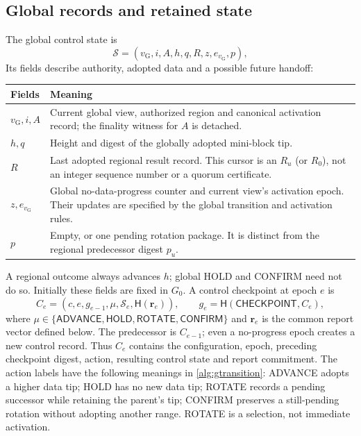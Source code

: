 \documentclass[11pt,a4paper,onecolumn]{article}
\newcommand{\Hash}{\mathsf H}
\newcommand{\gv}{v_{\mathrm G}}
\newcommand{\Tag}[1]{\mathsf{#1}}
\theoremstyle{remark}\newtheorem{example}[definition]{Example}
\begin{document}
\subsection{Global records and retained state}\label{sec:gobjects}
The global control state is
\[
 \mathcal S=(\gv,i,A,h,q,R,z,e_{\gv},p),
\]
Its fields describe authority, adopted data and a possible future handoff:
\begin{center}\small
\begin{tabularx}{\textwidth}{@{}p{}Y@{}}\toprule
Fields & Meaning\\\midrule
$\gv,i,A$ & Current global view, authorized region and canonical activation
record; the finality witness for $A$ is detached.\\
$h,q$ & Height and digest of the globally adopted mini-block tip.\\
$R$ & Last adopted regional result record. This cursor is an $R_u$ (or $R_0$),
not an integer sequence number or a quorum certificate.\\
$z,e_{\gv}$ & Global no-data-progress counter and current view's activation
epoch. Their updates are specified by the global transition and activation rules.\\
$p$ & Empty, or one pending rotation package. It is distinct from the
regional predecessor digest $p_u$.\\\bottomrule
\end{tabularx}
\end{center}
A regional outcome always advances $h$; global HOLD and CONFIRM need not do so.
Initially these fields are fixed in $G_0$.
A control checkpoint at epoch $e$ is
\begin{equation}\label{eq:global}
 C_e=(c,e,g_{e-1},\mu,\mathcal S_e,\Hash(\mathbf r_e)),\qquad
 g_e=\Hash(\Tag{CHECKPOINT},C_e),
\end{equation}
where $\mu\in\{\Tag{ADVANCE},\Tag{HOLD},\Tag{ROTATE},\Tag{CONFIRM}\}$ and
$\mathbf r_e$ is the common report vector defined below. The predecessor is
$C_{e-1}$; even a no-progress epoch creates a new control record. Thus $C_e$
contains the configuration, epoch, preceding checkpoint digest, action,
resulting control state and report commitment. The action labels have the
following meanings in \cref{alg:gtransition}: ADVANCE adopts a higher data
tip; HOLD has no new data tip; ROTATE records a pending successor while
retaining the parent's tip; CONFIRM preserves a still-pending rotation without
adopting another range. ROTATE is a selection, not immediate activation.
\end{document}
